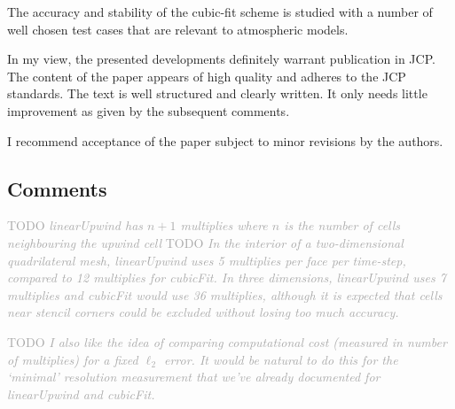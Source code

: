 \documentclass[times]{elsarticle}
\newcommand{\TODO}[1]{\textcolor{darkgray}{TODO \textit{#1}}}
\begin{document}
The accuracy and stability of the cubic-fit scheme is studied with a number of well 
chosen test cases that are relevant to atmospheric models. 

In my view, the presented developments definitely warrant publication in JCP. 
The content of the paper appears of high quality and adheres to the JCP standards. 
The text is well structured and clearly written. It only needs little improvement 
as given by the subsequent comments. 

I recommend acceptance of the paper subject to minor revisions by the authors.

\subsection*{Comments}

\begin{quotation}
\begin{comment}
\item  It is explained in various places that the cubic-fit scheme
    offers favourable computational efficiency due to the fact
    that most of the reconstruction depends on the mesh geometry
    only, and this part can be precomputed. It would be very interesting
    to see numbers in the paper. It doesn't have to be a comprehensive
    study, but just to get an impression of the cost, e.g. how does
    the runtime of the cubic-fit compare to the second-order upwind
    scheme? Or, if one runs cubic-fit and the upwind scheme such that
    both produce about the same $\ell_2$ error (by using a higher resolution
    with the upwind scheme), what is then the difference in runtime?
\end{comment}
\end{quotation}
\TODO{linearUpwind has $n+1$ multiplies where $n$ is the number of cells neighbouring the upwind cell}
\TODO{In the interior of a two-dimensional quadrilateral mesh, linearUpwind uses 5 multiplies per face per time-step, compared to 12 multiplies for cubicFit.
In three dimensions, linearUpwind uses 7 multiplies and cubicFit would use 36 multiplies, although it is expected that cells near stencil corners could be excluded without losing too much accuracy.}

\TODO{I also like the idea of comparing computational cost (measured in number of multiplies) for a fixed $\ell_2$ error.  It would be natural to do this for the `minimal' resolution measurement that we've already documented for linearUpwind and cubicFit.}
\end{document}
